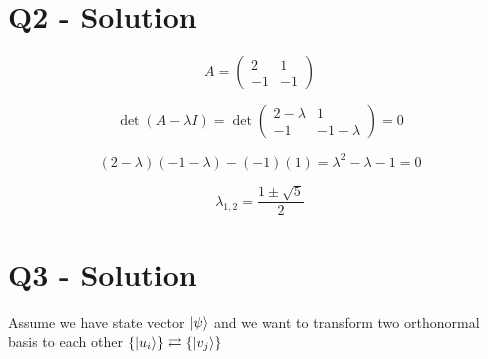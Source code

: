 \documentclass{article}
\begin{document}
\section*{Q2 - Solution}
\[
A = \begin{pmatrix} 2 & 1 \\ -1 & -1 \end{pmatrix}
\]

\[
\det(A - \lambda I) = \det \begin{pmatrix} 2 - \lambda & 1 \\ -1 & -1 - \lambda \end{pmatrix} = 0
\]

\[
(2 - \lambda)(-1 - \lambda) - (-1)(1) = \lambda^2 - \lambda - 1 = 0
\]


\[
\lambda_{1,2} = \frac{1 \pm \sqrt{5}}{2}
\]
\section*{Q3 - Solution}

Assume we have state vector $\ket{\psi}$ and we want to transform two orthonormal basis to each other $\{\ket{u_{i}}\} \rightleftarrows \{\ket{v_{j}}\}$
\end{document}
